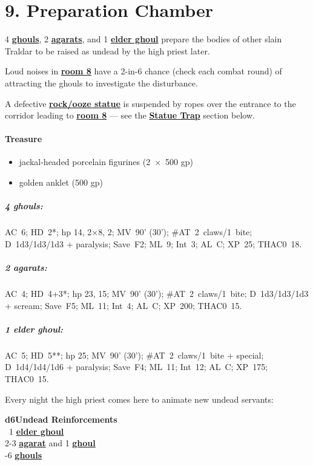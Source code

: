 \documentclass[english,11pt,openany,letterpaper,twocolumn]{book}
\begin{document}
\hypertarget{room9}{}
\section{9. Preparation Chamber}

4 \hyperlink{ghoul}{\textbf{ghouls}}, 2 \hyperlink{agarat}{\textbf{agarats}}, and 1 \hyperlink{elder-ghoul}{\textbf{elder ghoul}} prepare the bodies of other slain Traldar to be raised as undead by the high priest later.

\tab Loud noises in \hyperlink{room8}{\textbf{room 8}} have a 2-in-6 chance (check each combat round) of attracting the ghouls to investigate the disturbance.

\tab A defective \hyperlink{statue}{\textbf{rock/ooze statue}} is suspended by ropes over the entrance to the corridor leading to \hyperlink{room9}{\textbf{room 8}} --- see the \hyperlink{statue-trap}{\textbf{Statue Trap}} section below.

\skipline
\paragraph{Treasure}
\begin{itemize}[leftmargin=*]
	\item jackal-headed porcelain figurines (2~×~500 gp)
	\item golden anklet (500 gp)
\end{itemize}


\begin{textbox}
	\subparagraph{4 ghouls:} AC~6; HD~2*; hp 14, 2×8, 2; MV~90' (30'); \#AT~2~claws/1~bite; D~1d3/1d3/1d3 + paralysis; Save~F2; ML~9; Int~3; AL~C; XP~25; THAC0~18.
	
	\subparagraph{2 agarats:} AC~4; HD~4+3*; hp 23, 15; MV~90' (30'); \#AT~2~claws/1~bite; D~1d3/1d3/1d3 + scream; Save~F5; ML~11; Int~4; AL~C; XP~200; THAC0~15.
	
	\subparagraph{1 elder ghoul:} AC~5; HD~5**; hp 25; MV~90' (30'); \#AT~2~claws/1~bite + special; D~1d4/1d4/1d6 + paralysis; Save~F4; ML~11; Int~12; AL~C; XP~175; THAC0~15.
\end{textbox}

	\tab Every night the high priest comes here to animate new undead servants:
	
	\ulf\textbf{d6}\tab\tab\textbf{Undead Reinforcements}\\
	~1\tab{} \hyperlink{elder-ghoul}{\textbf{elder ghoul}}\\
	2-3\tab{} \hyperlink{agarat}{\textbf{agarat}} and 1 \hyperlink{ghoul}{\textbf{ghoul}}\\
	-6\tab{} \hyperlink{ghoul}{\textbf{ghouls}}
\end{document}
